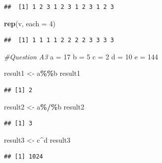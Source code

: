 \documentclass[
]{article}
\newenvironment{Shaded}{\begin{snugshade}}{\end{snugshade}}
\newcommand{\AttributeTok}[1]{\textcolor[rgb]{0.13,0.29,0.53}{#1}}
\newcommand{\CommentTok}[1]{\textcolor[rgb]{0.56,0.35,0.01}{\textit{#1}}}
\newcommand{\DecValTok}[1]{\textcolor[rgb]{0.00,0.00,0.81}{#1}}
\newcommand{\FunctionTok}[1]{\textcolor[rgb]{0.13,0.29,0.53}{\textbf{#1}}}
\newcommand{\NormalTok}[1]{#1}
\newcommand{\OtherTok}[1]{\textcolor[rgb]{0.56,0.35,0.01}{#1}}
\newcommand{\SpecialCharTok}[1]{\textcolor[rgb]{0.81,0.36,0.00}{\textbf{#1}}}
\begin{document}
\begin{verbatim}
##  [1] 1 2 3 1 2 3 1 2 3 1 2 3
\end{verbatim}

\begin{Shaded}
\begin{Highlighting}[]
\FunctionTok{rep}\NormalTok{(v, }\AttributeTok{each =} \DecValTok{4}\NormalTok{)}
\end{Highlighting}
\end{Shaded}

\begin{verbatim}
##  [1] 1 1 1 1 2 2 2 2 3 3 3 3
\end{verbatim}

\begin{Shaded}
\begin{Highlighting}[]
\CommentTok{\#Question A3}
\NormalTok{a }\OtherTok{=} \DecValTok{17}
\NormalTok{b }\OtherTok{=} \DecValTok{5}
\NormalTok{c }\OtherTok{=} \DecValTok{2}
\NormalTok{d }\OtherTok{=} \DecValTok{10}
\NormalTok{e }\OtherTok{=} \DecValTok{144}

\NormalTok{result1 }\OtherTok{\textless{}{-}}\NormalTok{ a}\SpecialCharTok{\%\%}\NormalTok{b}
\NormalTok{result1}
\end{Highlighting}
\end{Shaded}

\begin{verbatim}
## [1] 2
\end{verbatim}

\begin{Shaded}
\begin{Highlighting}[]
\NormalTok{result2 }\OtherTok{\textless{}{-}}\NormalTok{ a}\SpecialCharTok{\%/\%}\NormalTok{b}
\NormalTok{result2}
\end{Highlighting}
\end{Shaded}

\begin{verbatim}
## [1] 3
\end{verbatim}

\begin{Shaded}
\begin{Highlighting}[]
\NormalTok{result3 }\OtherTok{\textless{}{-}}\NormalTok{ c}\SpecialCharTok{\^{}}\NormalTok{d}
\NormalTok{result3}
\end{Highlighting}
\end{Shaded}

\begin{verbatim}
## [1] 1024
\end{verbatim}
\end{document}
